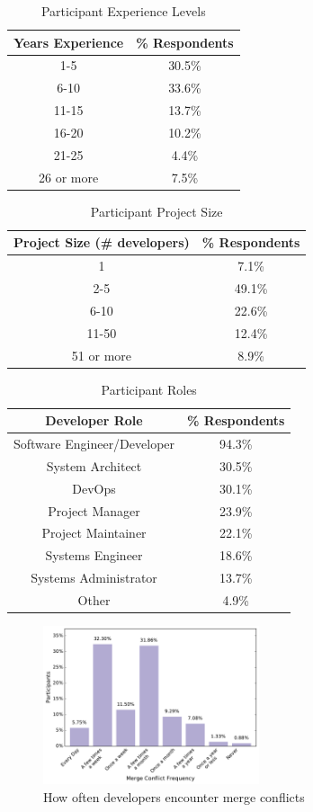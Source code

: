 \documentclass[conference]{IEEEtran}
\begin{document}
\begin{table}[!t]
\renewcommand{\arraystretch}{1.3}
\caption{Participant Experience Levels}
\label{exp_levels}
\centering
\begin{tabular}{|c||c|}
\hline
Years Experience & \% Respondents\\
\hline
1-5 & 30.5\%\\
6-10 & 33.6\%\\
11-15 & 13.7\%\\
16-20 & 10.2\%\\
21-25 & 4.4\%\\
26 or more & 7.5\%\\
\hline
\end{tabular}
\end{table}

\begin{table}[!t]
\renewcommand{\arraystretch}{1.3}
\caption{Participant Project Size}
\label{project_size}
\centering
\begin{tabular}{|c||c|}
\hline
Project Size (\# developers) & \% Respondents\\
\hline
1 & 7.1\%\\
2-5 & 49.1\%\\
6-10 & 22.6\%\\
11-50 & 12.4\%\\
51 or more & 8.9\%\\
\hline
\end{tabular}
\end{table}

\begin{table}[!t]
\renewcommand{\arraystretch}{1.3}
\caption{Participant Roles}
\label{roles_table}
\centering
\begin{tabular}{|c||c|}
\hline
Developer Role & \% Respondents\\
\hline
Software Engineer/Developer & 94.3\%\\
System Architect & 30.5\%\\
DevOps & 30.1\%\\
Project Manager & 23.9\%\\
Project Maintainer & 22.1\%\\
Systems Engineer & 18.6\%\\
Systems Administrator & 13.7\%\\
Other & 4.9\%\\
\hline
\end{tabular}
\end{table}


\begin{figure}[!t]
\centering
\includegraphics[width=2.5in]{conflict_frequency.pdf}
\caption{How often developers encounter merge conflicts}
\label{conflict_frequency}
\end{figure}
\end{document}
